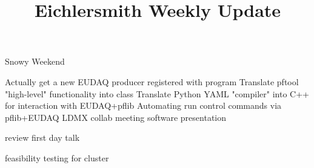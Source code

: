 \documentclass[aspectratio=169]{beamer}
\title[Weekly Update]{Eichlersmith Weekly Update}
\begin{document}
\begin{frame}{Snowy Weekend}{}

  \begin{itemize}
    \done Actually get a new EUDAQ producer registered with program
    \done Translate pftool "high-level" functionality into  class
    \todo Translate Python YAML "compiler" into C++ for interaction with EUDAQ+pflib
    \todo Automating run control commands via pflib+EUDAQ
    \todo LDMX collab meeting software presentation
  \end{itemize}

  \begin{itemize}
    \done review first day talk
  \end{itemize}

  \begin{itemize}
    \todo feasibility testing for cluster
  \end{itemize}
\end{frame}
\end{document}
